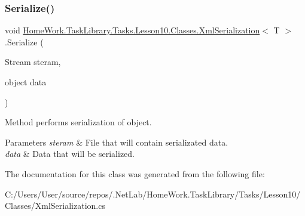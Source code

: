 \subsubsection{\texorpdfstring{Serialize()}{Serialize()}}
{\footnotesize\ttfamily void \mbox{\hyperlink{class_home_work_1_1_task_library_1_1_tasks_1_1_lesson10_1_1_classes_1_1_xml_serialization}{Home\+Work.\+Task\+Library.\+Tasks.\+Lesson10.\+Classes.\+Xml\+Serialization}}$<$ T $>$.Serialize (\begin{DoxyParamCaption}\item[{Stream}]{steram,  }\item[{object}]{data }\end{DoxyParamCaption})}



Method performs serialization of object. 


\begin{DoxyParams}{Parameters}
{\em steram} & File that will contain serializated data.\\
\hline
{\em data} & Data that will be serialized.\\
\hline
\end{DoxyParams}


The documentation for this class was generated from the following file\+:\begin{DoxyCompactItemize}
\item 
C\+:/\+Users/\+User/source/repos/.\+Net\+Lab/\+Home\+Work.\+Task\+Library/\+Tasks/\+Lesson10/\+Classes/Xml\+Serialization.\+cs\end{DoxyCompactItemize}
